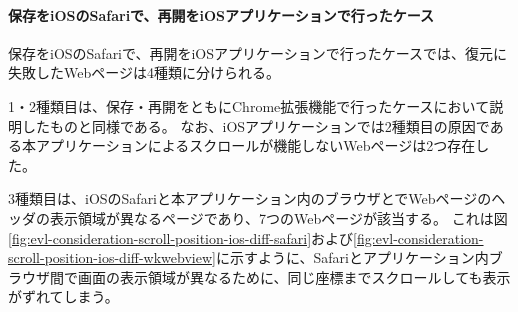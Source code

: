 \paragraph{保存をiOSのSafariで、再開をiOSアプリケーションで行ったケース}

保存をiOSのSafariで、再開をiOSアプリケーションで行ったケースでは、復元に失敗したWebページは4種類に分けられる。

1・2種類目は、保存・再開をともにChrome拡張機能で行ったケースにおいて説明したものと同様である。
なお、iOSアプリケーションでは2種類目の原因である本アプリケーションによるスクロールが機能しないWebページは2つ存在した。

3種類目は、iOSのSafariと本アプリケーション内のブラウザとでWebページのヘッダの表示領域が異なるページであり、7つのWebページが該当する。
これは図\ref{fig:evl-consideration-scroll-position-ios-diff-safari}および\ref{fig:evl-consideration-scroll-position-ios-diff-wkwebview}に示すように、Safariとアプリケーション内ブラウザ間で画面の表示領域が異なるために、同じ座標までスクロールしても表示がずれてしまう。

